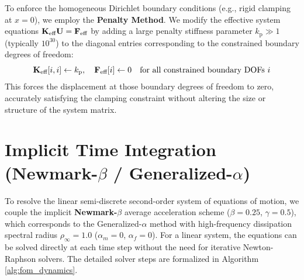 To enforce the homogeneous Dirichlet boundary conditions (e.g., rigid clamping at $x=0$), we employ the \textbf{Penalty Method}. We modify the effective system equations $\mathbf{K}_{\text{eff}}\mathbf{U} = \mathbf{F}_{\text{eff}}$ by adding a large penalty stiffness parameter $k_{\text{p}} \gg 1$ (typically $10^{30}$) to the diagonal entries corresponding to the constrained boundary degrees of freedom:
\begin{equation}
    \mathbf{K}_{\text{eff}}[i, i] \gets k_{\text{p}}, \quad \mathbf{F}_{\text{eff}}[i] \gets 0 \quad \text{for all constrained boundary DOFs } i
\end{equation}
This forces the displacement at those boundary degrees of freedom to zero, accurately satisfying the clamping constraint without altering the size or structure of the system matrix.

\section[\texorpdfstring{Implicit Time Integration (Newmark-$\beta$ / Generalized-$\alpha$)}{Implicit Time Integration (Newmark-beta / Generalized-alpha)}]{Implicit Time Integration \\ (\texorpdfstring{Newmark-$\beta$}{Newmark-beta} / Generalized-\texorpdfstring{$\alpha$}{alpha})}
To resolve the linear semi-discrete second-order system of equations of motion, we couple the implicit \textbf{Newmark-$\beta$} average acceleration scheme ($\beta=0.25$, $\gamma=0.5$), which corresponds to the Generalized-$\alpha$ method with high-frequency dissipation spectral radius $\rho_{\infty} = 1.0$ ($\alpha_m = 0$, $\alpha_f = 0$). For a linear system, the equations can be solved directly at each time step without the need for iterative Newton-Raphson solvers. The detailed solver steps are formalized in Algorithm \ref{alg:fom_dynamics}.

